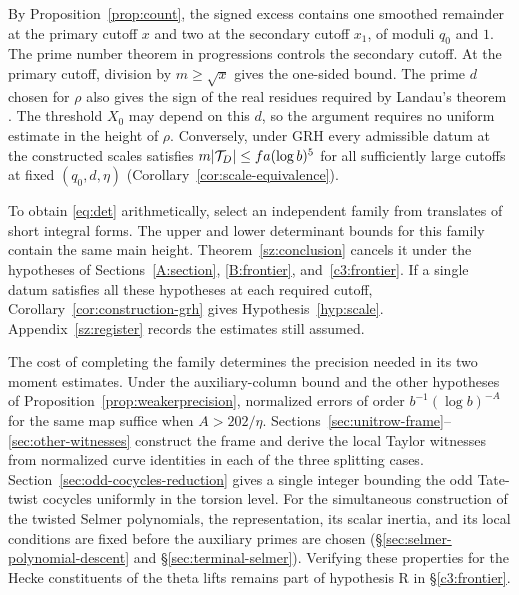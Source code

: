 By Proposition~\ref{prop:count}, the signed excess contains one smoothed remainder at the primary cutoff \(x\) and two at the secondary cutoff \(x_1\), of moduli \(q_0\) and \(1\). The prime number theorem in progressions controls the secondary cutoff. At the primary cutoff, division by \(m\ge\sqrt{x}\) gives the one-sided bound. The prime \(d\) chosen for \(\rho\) also gives the sign of the real residues required by Landau's theorem \cite{MV,widder}. The threshold \(X_0\) may depend on this \(d\), so the argument requires no uniform estimate in the height of \(\rho\). Conversely, under GRH every admissible datum at the constructed scales satisfies \(m|\mathcal T_D|\le fa(\log b)^5\) for all sufficiently large cutoffs at fixed \((q_0,d,\eta)\) (Corollary~\ref{cor:scale-equivalence}).

To obtain \eqref{eq:det} arithmetically, select an independent family from translates of short integral forms. The upper and lower determinant bounds for this family contain the same main height. Theorem~\ref{sz:conclusion} cancels it under the hypotheses of Sections~\ref{A:section}, \ref{B:frontier}, and~\ref{c3:frontier}. If a single datum satisfies all these hypotheses at each required cutoff, Corollary~\ref{cor:construction-grh} gives Hypothesis~\ref{hyp:scale}. Appendix~\ref{sz:register} records the estimates still assumed.

The cost of completing the family determines the precision needed in its two moment estimates. Under the auxiliary-column bound and the other hypotheses of Proposition~\ref{prop:weakerprecision}, normalized errors of order \(b^{-1}(\log b)^{-A}\) for the same map suffice when \(A>202/\eta\).
Sections~\ref{sec:unitrow-frame}--\ref{sec:other-witnesses} construct the frame and derive the local Taylor witnesses from normalized curve identities in each of the three splitting cases. Section~\ref{sec:odd-cocycles-reduction} gives a single integer bounding the odd Tate-twist cocycles uniformly in the torsion level. For the simultaneous construction of the twisted Selmer polynomials, the representation, its scalar inertia, and its local conditions are fixed before the auxiliary primes are chosen (\S\ref{sec:selmer-polynomial-descent} and \S\ref{sec:terminal-selmer}). Verifying these properties for the Hecke constituents of the theta lifts remains part of hypothesis R in \S\ref{c3:frontier}.
